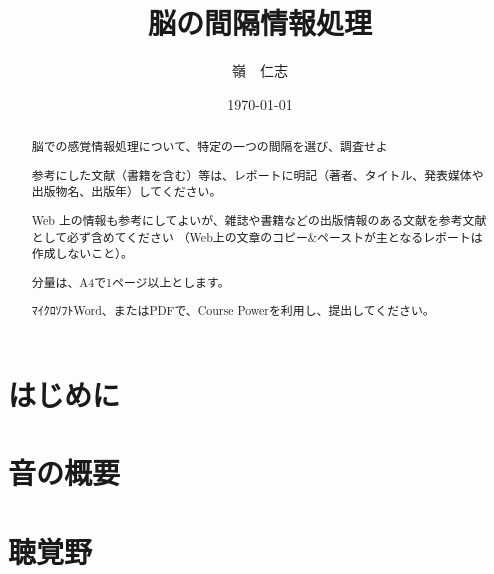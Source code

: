 \documentclass[15pt]{jarticle}
\title{脳の間隔情報処理}
\author{嶺　仁志}
\date{\today}
\begin{document}
\maketitle

\begin{abstract}
脳での感覚情報処理について、特定の一つの間隔を選び、調査せよ

参考にした文献（書籍を含む）等は、レポートに明記（著者、タイトル、発表媒体や出版物名、出版年）してください。

Web 上の情報も参考にしてよいが、雑誌や書籍などの出版情報のある文献を参考文献として必ず含めてください
（Web上の文章のコピー\&ペーストが主となるレポートは作成しないこと）。

分量は、A4で1ページ以上とします。

ﾏｲｸﾛｿﾌﾄWord、またはPDFで、Course Powerを利用し、提出してください。
\end{abstract}


\section{はじめに}

\section{音の概要}

\section{聴覚野}
\cite{聴覚野}



\end{document}
